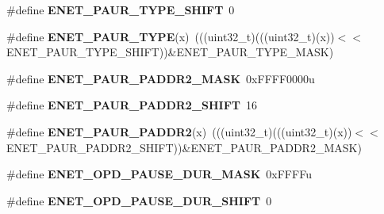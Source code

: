 \begin{DoxyCompactItemize}
\item 
\#define {\bfseries E\+N\+E\+T\+\_\+\+P\+A\+U\+R\+\_\+\+T\+Y\+P\+E\+\_\+\+S\+H\+I\+FT}~0\hypertarget{group__ENET__Register__Masks_ga52173426863fc14a746a5c85d5a3ac12}{}\label{group__ENET__Register__Masks_ga52173426863fc14a746a5c85d5a3ac12}

\item 
\#define {\bfseries E\+N\+E\+T\+\_\+\+P\+A\+U\+R\+\_\+\+T\+Y\+PE}(x)~(((uint32\+\_\+t)(((uint32\+\_\+t)(x))$<$$<$E\+N\+E\+T\+\_\+\+P\+A\+U\+R\+\_\+\+T\+Y\+P\+E\+\_\+\+S\+H\+I\+FT))\&E\+N\+E\+T\+\_\+\+P\+A\+U\+R\+\_\+\+T\+Y\+P\+E\+\_\+\+M\+A\+SK)\hypertarget{group__ENET__Register__Masks_ga3159a924961395aaf0c16ed5e44f7c34}{}\label{group__ENET__Register__Masks_ga3159a924961395aaf0c16ed5e44f7c34}

\item 
\#define {\bfseries E\+N\+E\+T\+\_\+\+P\+A\+U\+R\+\_\+\+P\+A\+D\+D\+R2\+\_\+\+M\+A\+SK}~0x\+F\+F\+F\+F0000u\hypertarget{group__ENET__Register__Masks_ga704d9ce6ebfb6b00ae75c12cd226c30c}{}\label{group__ENET__Register__Masks_ga704d9ce6ebfb6b00ae75c12cd226c30c}

\item 
\#define {\bfseries E\+N\+E\+T\+\_\+\+P\+A\+U\+R\+\_\+\+P\+A\+D\+D\+R2\+\_\+\+S\+H\+I\+FT}~16\hypertarget{group__ENET__Register__Masks_ga8a4febd50d867c00d02977b3a4a865dd}{}\label{group__ENET__Register__Masks_ga8a4febd50d867c00d02977b3a4a865dd}

\item 
\#define {\bfseries E\+N\+E\+T\+\_\+\+P\+A\+U\+R\+\_\+\+P\+A\+D\+D\+R2}(x)~(((uint32\+\_\+t)(((uint32\+\_\+t)(x))$<$$<$E\+N\+E\+T\+\_\+\+P\+A\+U\+R\+\_\+\+P\+A\+D\+D\+R2\+\_\+\+S\+H\+I\+FT))\&E\+N\+E\+T\+\_\+\+P\+A\+U\+R\+\_\+\+P\+A\+D\+D\+R2\+\_\+\+M\+A\+SK)\hypertarget{group__ENET__Register__Masks_ga177d37e2b7ec40d918363854e76f0d51}{}\label{group__ENET__Register__Masks_ga177d37e2b7ec40d918363854e76f0d51}

\item 
\#define {\bfseries E\+N\+E\+T\+\_\+\+O\+P\+D\+\_\+\+P\+A\+U\+S\+E\+\_\+\+D\+U\+R\+\_\+\+M\+A\+SK}~0x\+F\+F\+F\+Fu\hypertarget{group__ENET__Register__Masks_ga1c63364c148916da71bb917ea8d96adf}{}\label{group__ENET__Register__Masks_ga1c63364c148916da71bb917ea8d96adf}

\item 
\#define {\bfseries E\+N\+E\+T\+\_\+\+O\+P\+D\+\_\+\+P\+A\+U\+S\+E\+\_\+\+D\+U\+R\+\_\+\+S\+H\+I\+FT}~0\hypertarget{group__ENET__Register__Masks_ga0cd72f21fa65e5ce01260fdf303bc9e2}{}\label{group__ENET__Register__Masks_ga0cd72f21fa65e5ce01260fdf303bc9e2}


\end{DoxyCompactItemize}
